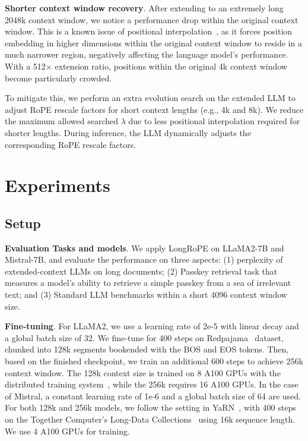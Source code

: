 \textbf{Shorter context window recovery}.  After extending to an extremely long 2048k context window, we notice a performance drop within the original context window. This is a known issue of positional interpolation~\cite{pi}, as it forces position embedding in higher dimensions within the original context window to reside in a much narrower region, negatively affecting the language model's performance. With a 512$\times$ extension ratio, positions within the original 4k context window become particularly crowded.

To mitigate this, we perform an extra evolution search on the extended LLM to adjust RoPE rescale factors for short context lengths (e.g., 4k and 8k). We reduce the maximum allowed searched $\lambda$ due to less positional interpolation required for shorter lengths. During inference, the LLM dynamically adjusts the corresponding RoPE rescale factors.

 \section{Experiments}

 \label{sec:exp}
\subsection{Setup}
\textbf{Evaluation Tasks and models}. We apply LongRoPE on LLaMA2-7B and Mistral-7B, and evaluate the performance on three aspects: (1) perplexity of extended-context LLMs on long documents; (2) Passkey retrieval task that measures a model's ability to retrieve a simple passkey from a sea of irrelevant text; and (3) Standard LLM benchmarks within a short 4096 context window size. 

\textbf{Fine-tuning}. For LLaMA2, we use a learning rate of 2e-5 with linear decay and a global batch size of 32. We fine-tune for 400 steps on  Redpajama~\cite{redpajama} dataset, chunked into  128k segments bookended with the BOS and EOS tokens. Then, based on the finished checkpoint, we train an additional 600 steps to achieve 256k context window. The 128k context size is trained on 8 A100 GPUs with the distributed training system~\cite{cube}, while the 256k requires 16 A100 GPUs. In the case of Mistral, a constant learning rate of 1e-6 and a global batch size of 64 are used. For both 128k and 256k  models, we follow the setting in YaRN~\cite{yarn}, with  400 steps on the Together Computer's Long-Data Collections~\cite{mistraldata} using 16k sequence length. We use 4 A100 GPUs for training.

